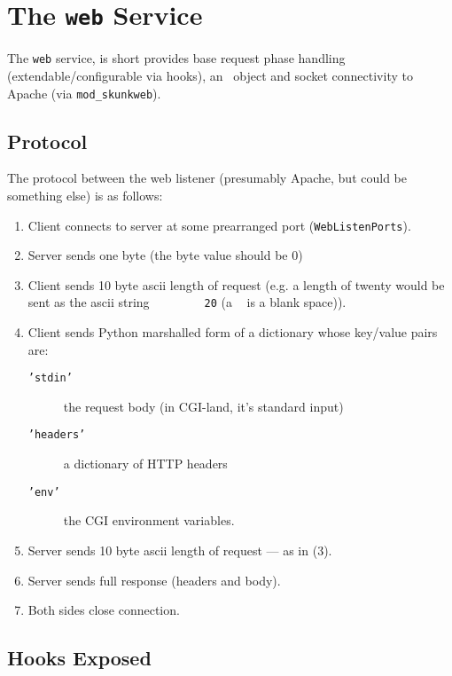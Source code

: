 \documentclass{manual}
\begin{document}
\chapter{The \texttt{web} Service}
The \texttt{web} service, is short provides base request phase
handling (extendable/configurable via hooks), an \connection\ object
and socket connectivity to 
Apache (via \texttt{mod\_skunkweb}).


\section{Protocol}
The protocol between the web listener (presumably Apache, but could be
something else) is as follows:
\begin{enumerate}
\item Client connects to server at some prearranged port
(\texttt{WebListenPorts}).
\item Server sends one byte (the byte value should be 0)
\item Client sends 10 byte ascii length of request (e.g. a length of
twenty would be sent as the ascii string \verb*!        20! (a 
\verb*! ! is a blank space)).
\item Client sends Python marshalled form of a dictionary whose
key/value pairs are:
\begin{description}
\item[\texttt{'stdin'}] the request body (in CGI-land, it's standard
input)
\item[\texttt{'headers'}] a dictionary of HTTP headers
\item[\texttt{'env'}] the CGI environment variables.
\end{description}
\item Server sends 10 byte ascii length of request --- as in (3).
\item Server sends full response (headers and body).
\item Both sides close connection.
\end{enumerate}

\section{Hooks Exposed}
\end{document}
